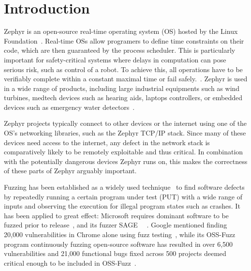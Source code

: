 \documentclass[twocolumn]{article}
\let\savedCite=\cite
\renewcommand{\cite}{\unskip~\savedCite}
\begin{document}
\clearpage\newpage
\onecolumn

\tableofcontents
\clearpage\newpage
\twocolumn
{}


\section{Introduction}
\label{Introduction}

Zephyr is an open-source real-time operating system (OS) hosted by the Linux Foundation\cite{ZephyrAbout}. Real-time OSs allow programers to define time constraints on their code, which are then guaranteed by the process scheduler. This is particularly important for safety-critical systems where delays in computation can pose serious risk, such as control of a robot. To achieve this, all operations have to be verifiably complete within a constant maximal time or fail safely.\cite{RTOSWiki}. Zephyr is used in a wide range of products, including large industrial equipments such as wind turbines, medtech devices such as hearing aids, laptops controllers, or embedded devices such as emergency water detectors\cite{ZephyrUsedIn}.

Zephyr projects typically connect to other devices or the internet using one of the OS's networking libraries, such as the Zephyr TCP/IP stack. Since many of these devices need access to the internet, any defect in the network stack is comparatively likely to be remotely exploitable and thus critical. In combination with the potentially dangerous devices Zephyr runs on, this makes the correctness of these parts of Zephyr arguably important.

Fuzzing has been established as a widely used technique\cite{Demystifying} to find software defects by repeatedly running a certain program under test (PUT) with a wide range of inputs and observing the execution for illegal program states such as crashes. It has been applied to great effect: Microsoft requires dominant software to be fuzzed prior to release\cite{Demystifying}, and its fuzzer SAGE\cite{SAGE} \cite{FuzzingTheStateOfTheArt}. Google mentioned finding 20,000 vulnerabilities in Chrome alone using fuzz testing\cite{Demystifying}, while its OSS-Fuzz program continuously fuzzing open-source software has resulted in over 6,500 vulnerabilities and 21,000 functional bugs fixed across 500 projects deemed critical enough to be included in OSS-Fuzz\cite{ClusterFuzzLite}.
\end{document}
